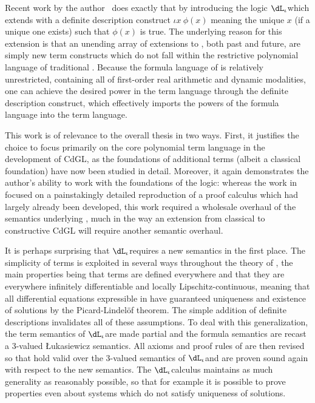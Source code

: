 \documentclass[12pt]{cmuthesis}
\theoremstyle{definition}
\theoremstyle{remark}
\newcommand{\meps}[2]{\iota{#1}~{#2}}
\newcommand{\rref}[2][]{\prettyref{#2}}
\newcommand{\CdGL}{\textsf{CdGL}\xspace}
\newcommand{\dLi}{\ensuremath{\dL_\iota}}
\begin{document}
Recent work by the author~\cite{hilbert-epsilons} does exactly that by introducing the logic \dLi which extends \dL with a definite description construct $\meps{x}{\phi(x)}$ meaning the unique $x$ (if a unique one exists) such that $\phi(x)$ is true.
The underlying reason for this extension is that an unending array of extensions to \dL, both past and future, are simply new term constructs which do not fall within the restrictive polynomial language of traditional \dL.
Because the formula language of \dL is relatively unrestricted, containing all of first-order real arithmetic and dynamic modalities, one can achieve the desired power in the term language through the definite description construct, which effectively imports the powers of the formula language into the term language.

This work is of relevance to the overall thesis in two ways.
First, it justifies the choice to focus primarily on the core polynomial term language in the development of \CdGL, as the foundations of additional terms (albeit a classical foundation) have now been studied in detail.
Moreover, it again demonstrates the author's ability to work with the foundations of the logic: whereas the work in \rref{sec:isabelle-fml} focused on a painstakingly detailed reproduction of a proof calculus which had largely already been developed, this work required a wholesale overhaul of the semantics underlying \dL, much in the way an extension from classical \dGL to constructive \CdGL will require another semantic overhaul.

It is perhaps surprising that \dLi requires a new semantics in the first place.
The simplicity of \dL terms is exploited in several ways throughout the theory of \dL, the main properties being that terms are defined everywhere and that they are everywhere infinitely differentiable and locally Lipschitz-continuous, meaning that all differential equations expressible in \dL have guaranteed uniqueness and existence of solutions by the Picard-Lindel\"of theorem.
The simple addition of definite descriptions invalidates all of these assumptions.
To deal with this generalization, the term semantics of \dLi are made partial and the formula semantics are recast a 3-valued {\L}ukasiewicz semantics.
All axioms and proof rules of \dL are then revised so that hold valid over the 3-valued semantics of \dLi and are proven sound again with respect to the new semantics.
The \dLi calculus maintains as much generality as reasonably possible, so that for example it is possible to prove properties even about systems which do not satisfy uniqueness of solutions.
\end{document}
